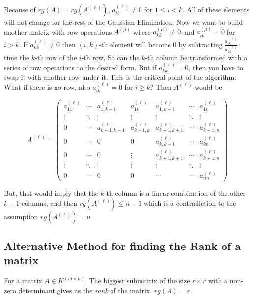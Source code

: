 Because of \(rg(A) = rg(A^{(\ell)})\), \(a^{(\ell)}_{ii} \ne 0\) for \(1 \le i < k\). All of these 
elements will not change for the rest of the Gaussian Elimination. Now we want to build another matrix 
with row operations \(A^{(\mu)}\) where \(a^{(\mu)}_{kk} \ne 0\) and \(a^{(\mu)}_{ik} = 0\) for 
\(i > k\). If \(a^{(\ell)}_{kk} \ne 0\) then \((i,k)\)-th element will become 0 by subtracting 
\(\frac{a^{(\ell)}_{ik}}{a^{(\ell)}_{kk}}\) time the \(k\)-th row of the \(i\)-th row. So can the \(k\)-th 
column be transformed with a series of row operations to the desired form. But if \(a^{(\ell)}_{kk} = 0\), 
then you have to swap it with another row under it. This is the critical point of the algorithm: What 
if there is no row, also \(a^{(\ell)}_{ik} = 0\) for \(i \ge k\)? Then \(A^{(\ell)}\) would be:

\[
A^{(\ell)} =
\begin{pmatrix}
a^{(\ell)}_{11} & \cdots & a^{(\ell)}_{1,k-1} & a^{(\ell)}_{1k} & a^{(\ell)}_{1,k+1} & \cdots & a^{(\ell)}_{1n} \\
\vdots & \ddots & \vdots & \vdots & \vdots & \ddots & \vdots \\
0 & \cdots & a^{(\ell)}_{k-1,k-1} & a^{(\ell)}_{k-1,k} & a^{(\ell)}_{k-1,k+1} & \cdots & a^{(\ell)}_{k-1,n} \\
0 & \cdots & 0 & 0 & a^{(\ell)}_{k,k+1} & \cdots & a^{(\ell)}_{kn} \\
0 & \cdots & 0 & \vdots & a^{(\ell)}_{k+1,k+1} & \cdots & a^{(\ell)}_{k+1,n} \\
\vdots & \ddots & \vdots & \vdots & \vdots & \ddots & \vdots \\
0 & \cdots & 0 & 0 & \cdots & \cdots & a^{(\ell)}_{nn}
\end{pmatrix}
\]

But, that would imply that the \(k\)-th column is a linear combination of the other \(k - 1\) columns, 
and then \(rg(A^{(\ell)}) \le n - 1\) which is a contradiction to the assumption  \(rg(A^{(\ell)}) = n\) 

\QED

\subsection{Alternative Method for finding the Rank of a matrix}

For a matrix \(A \in K^{(m \times n)}\). The biggest submatrix of the size \(r \times r\) with a 
non-zero determinant gives us the \emph{rank} of the matrix. \(rg(A) = r\).

